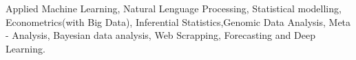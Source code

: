 \newpage
{}


\begin{cvparagraph}
Applied Machine Learning, Natural Lenguage Processing, Statistical modelling, Econometrics(with Big Data), Inferential Statistics,Genomic Data Analysis, Meta - Analysis, Bayesian data analysis, Web Scrapping, Forecasting and Deep Learning.

\end{cvparagraph}